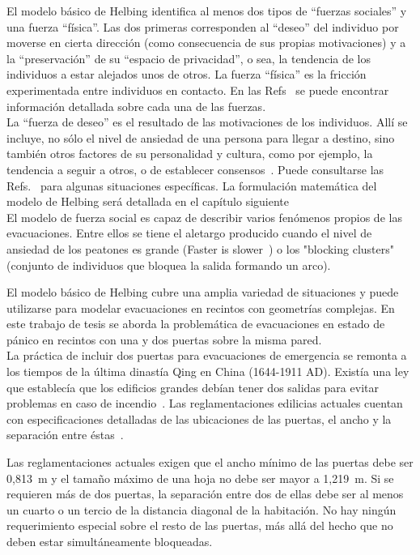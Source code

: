\noindent El modelo básico de Helbing identifica al menos dos tipos de “fuerzas sociales” y una fuerza “física”.  Las dos primeras corresponden al “deseo” del individuo por moverse en cierta dirección (como consecuencia de sus propias motivaciones) y a la “preservación” de su “espacio de privacidad”, o sea, la tendencia de los individuos a estar alejados unos de otros. La fuerza “física” es la  fricción experimentada entre individuos en contacto. En las Refs~\cite{Helbing1,Dorso1,Dorso3} se puede encontrar información detallada sobre cada una de las fuerzas.\\ 

\noindent La “fuerza de deseo” es el resultado de las motivaciones de los individuos. Allí se incluye, no sólo el nivel de ansiedad de una persona para llegar a destino, sino también otros factores de su personalidad y cultura, como por ejemplo, la tendencia a seguir a otros, o de establecer consensos~\cite{Dorso3,Dorso4}.  Puede consultarse las Refs.~\cite{Wang,low} para algunas situaciones específicas. 
La formulación matemática del modelo de Helbing será detallada en el capítulo siguiente \\ %

El modelo de fuerza social es capaz de describir varios fenómenos propios de las evacuaciones. Entre ellos se tiene el aletargo producido cuando el nivel de ansiedad de los peatones es grande (Faster is slower~\cite{Helbing1}) o los "blocking clusters"~\cite{Dorso1} (conjunto de individuos que bloquea la salida formando un arco).

\noindent El modelo básico de Helbing cubre una amplia variedad de situaciones y puede utilizarse para modelar evacuaciones en recintos con geometrías complejas. En este trabajo de tesis se aborda la problemática de evacuaciones en estado de pánico en recintos con una y dos puertas sobre la misma pared.\\ 

\noindent La práctica de incluir dos puertas para evacuaciones de emergencia se remonta a los tiempos de la última dinastía Qing en China (1644-1911 AD). Existía una ley que establecía que los edificios grandes debían tener dos salidas para evitar problemas en caso de incendio~\cite{cheng}.
Las reglamentaciones edilicias actuales cuentan con especificaciones detalladas de las ubicaciones de las puertas, el ancho y la separación entre éstas~\cite{OSHA,FLO}.
 
\noindent Las reglamentaciones actuales exigen que el ancho mínimo de las puertas debe ser 0,813~m y el tamaño máximo de una hoja no debe ser mayor a 1,219~m\cite{FLO,FLO2}. Si se requieren más de dos puertas, la separación entre dos de ellas debe ser al menos un cuarto o un tercio de la distancia diagonal de la habitación. No hay ningún requerimiento especial sobre el resto de las puertas, más allá del hecho que no deben estar simultáneamente bloqueadas\cite{FLO,FLO2}.\\

